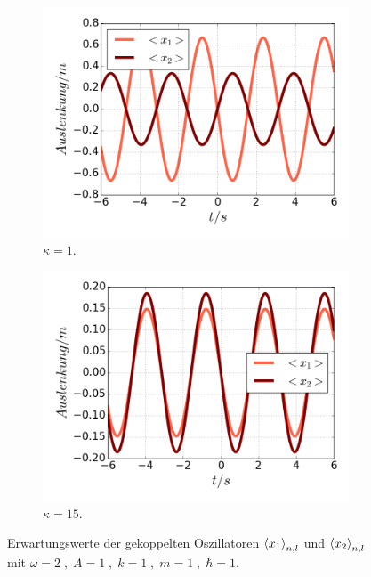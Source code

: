 \begin{figure}
\begin{subfigure}[t]{0.5\textwidth}
        \centering
        \includegraphics[width=\textwidth]{plots/<x12>nlschwach.png}
        \caption{$\kappa=1$.}
        \label{fig:schwach}
      \end{subfigure}
      \begin{subfigure}[t]{0.5\textwidth}
          \centering
          \includegraphics[width=\textwidth]{plots/<x12>nlstark.png}
          \caption{$\kappa=15$.}
          \label{fig:stark}
      \end{subfigure}
      \caption{Erwartungswerte der gekoppelten Oszillatoren $\braket{x_1}_{n,l}$ und $\braket{x_2}_{n,l}$ mit $\omega=2 \;,\; A=1 \;,\; k=1 \;,\; m=1 \;,\; \hbar=1$.}
    \end{figure}

